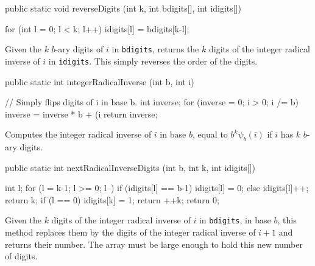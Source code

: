 \begin{code} 

   public static void reverseDigits (int k, int bdigits[], int idigits[])\begin{hide} {
      for (int l = 0; l < k; l++)
         idigits[l] = bdigits[k-l];
   }\end{hide}
\end{code}
 \begin{tabb}
   Given the $k$ $b$-ary digits of $i$ in \texttt{bdigits}, returns the 
   $k$ digits of the integer radical inverse of $i$ in \texttt{idigits}.
   This simply reverses the order of the digits.
 \end{tabb}
\begin{htmlonly}
\end{htmlonly}
\begin{code} 

   public static int integerRadicalInverse (int b, int i) \begin{hide} {
      // Simply flips digits of i in base b.
      int inverse;
      for (inverse = 0; i > 0; i /= b)
         inverse = inverse * b + (i %
      return inverse;
   }\end{hide}
\end{code}
 \begin{tabb}
   Computes the integer radical inverse of $i$ in base $b$,
   equal to $b^k \psi_b(i)$ if $i$ has $k$ $b$-ary digits.
 \end{tabb}
\begin{htmlonly}
\end{htmlonly}
\begin{code} 

   public static int nextRadicalInverseDigits (int b, int k, int idigits[])\begin{hide} {
      int l;
      for (l = k-1; l >= 0; l--)
         if (idigits[l] == b-1) 
            idigits[l] = 0;
         else {
            idigits[l]++;
            return k;
         }
      if (l == 0) {
         idigits[k] = 1;
         return ++k;
      }
      return 0;
   }\end{hide}
\end{code}
 \begin{tabb}
  Given the $k$ digits of the integer radical inverse of $i$ in \texttt{bdigits},
  in base $b$, this method replaces them by the digits of the integer 
  radical inverse of $i+1$ and returns their number.
  The array must be large enough to hold this new number of digits.
 \end{tabb}
